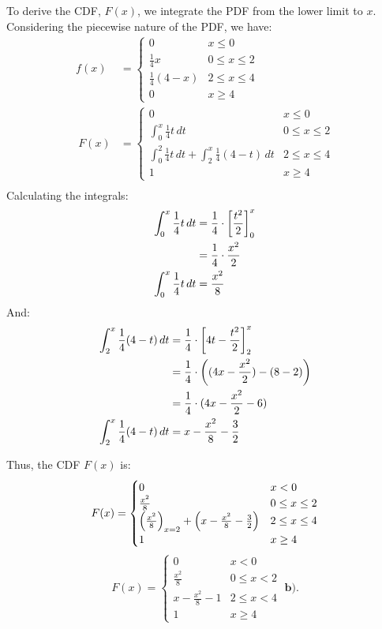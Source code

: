 \documentclass[a4paper, 10pt]{article}
\begin{document}
\begin{solution}
To derive the CDF, \( F(x) \), we integrate the PDF from the lower limit to \( x \). \\
Considering the piecewise nature of the PDF, we have:
\begin{align*}
    f(x) &= \begin{cases}
        0 & x \le 0 \\
        \frac{1}{4}x & 0 \leq x \le 2 \\
        \frac{1}{4}(4 - x) & 2 \leq x \le 4 \\
        0 & x \geq 4
    \end{cases} \\ \
    F(x) &= \begin{cases}
        0 & x \le 0 \\
        \int_{0}^{x} \frac{1}{4}t\,dt & 0 \leq x \le 2 \\
        \int_{0}^{2} \frac{1}{4}t\,dt + \int_{2}^{x} \frac{1}{4}(4 - t)\,dt & 2 \leq x \le 4 \\
        1 & x \geq 4
    \end{cases} \\
\end{align*}
Calculating the integrals:
\begin{align*}
    \int_{0}^{x} \frac{1}{4}t\,dt &= \frac{1}{4} \cdot \left[\frac{t^2}{2}\right]_{0}^{x} \\
    &= \frac{1}{4} \cdot \frac{x^2}{2} \\
    \int_{0}^{x} \frac{1}{4}t\,dt &= \frac{x^2}{8} \\
\end{align*}
And:
\begin{align*}
    \int_{2}^{x} \frac{1}{4}(4 - t)\,dt &= \frac{1}{4} \cdot \left[4t - \frac{t^2}{2}\right]_{2}^{x} \\
    &= \frac{1}{4} \cdot \left((4x - \frac{x^2}{2}) - (8 - 2)\right) \\
    &= \frac{1}{4} \cdot (4x - \frac{x^2}{2} - 6) \\
    \int_{2}^{x} \frac{1}{4}(4 - t)\,dt &= x - \frac{x^2}{8} - \frac{3}{2} \\
\end{align*}

Thus, the CDF \( F(x) \) is:
\[
F(x) = \begin{cases}
    0 & x < 0 \\
    \frac{x^2}{8} & 0 \leq x \le 2 \\
    \left(\frac{x^2}{8}\right)_{x=2} + \left(x - \frac{x^2}{8} - \frac{3}{2}\right) & 2 \leq x \le 4 \\
    1 & x \geq 4
\end{cases}
\]
\[
\boxed{F(x) = \begin{cases}
    0 & x < 0 \\
    \frac{x^2}{8} & 0 \leq x < 2 \\
    x - \frac{x^2}{8} - 1 & 2 \leq x < 4 \\
    1 & x \geq 4
\end{cases}} \; \textbf{b).}
\]
\end{solution}
\end{document}
